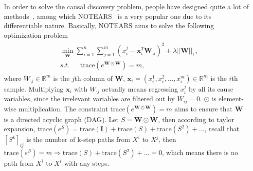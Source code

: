 \documentclass[conference]{IEEEtran}
\theoremstyle{definition}
\theoremstyle{theorem}
\theoremstyle{proof}
\theoremstyle{remark}
\begin{document}
In order to solve the causal discovery problem, people have designed quite a lot of methods~\cite{ng2019graph,zheng2018dags,brouillard2020differentiable}, among which NOTEARS~\cite{zheng2018dags} is a very popular one due to its differentiable nature.
Basically, NOTEARS aims to solve the following optimization problem
	\begin{eqnarray}\label{op}
		\begin{aligned}
			&\min_{\bm{W}}\sum_{i=1}^n\sum_{j=1}^m(x_i^j-\bm{x}_i^T\bm{W}_{\cdot j})^2 + \lambda||\bm{W}||_1,\\
			&s.t.~~~~~~~\text{trace}(e^{\bm{W}\odot \bm{W}}) = m,
		\end{aligned}
	\end{eqnarray}
where $W_{\cdot j}\in\mathbb{R}^{m}$ is the $j$th column of $\bm{W}$, $\bm{x}_i=(x_i^1,x_i^2,...,x_i^m)\in\mathbb{R}^{m}$ is the $i$th sample.
Multiplying $\bm{x}_i$ with $W_{\cdot j}$ actually means regressing $x_i^j$ by all its cause variables, since the irrelevant variables are filtered out by $W_{ij} = 0$.
$\odot$ is element-wise multiplication. The constraint $\text{trace}(e^{\bm{W}\odot \bm{W}}) = m$ aims to ensure that $\bm{W}$ is a directed acyclic graph (DAG).
Let $S=\bm{W}\odot \bm{W}$, then according to taylor expansion, $\text{trace}(e^{S}) = \text{trace}(\bm{I})+\text{trace}(S)+\text{trace}(S^2)+...$,
recall that $[S^k]_{ij}$ is the number of k-step paths from $X^i$ to $X^j$, then $\text{trace}(e^{S})=m \Rightarrow \text{trace}(S)+\text{trace}(S^2)+...=0$,
which means there is no path from $X^i$ to $X^i$ with any-steps.
\end{document}
